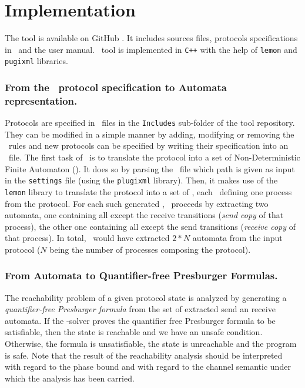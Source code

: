 \section{Implementation}
\label{sec:optim}

The tool is available on GitHub \cite{github.MPass}.
It includes sources files, protocols specifications in \Xml\ and the user manual.
%
\MPass\ tool is implemented in \texttt{C++} with the help of \texttt{lemon} and \texttt{pugixml} libraries.
%

\subsubsection*{From the \Xml\ protocol specification to Automata representation.}
\label{subsec:copies}
Protocols are specified in \Xml\ files in the \texttt{Includes} sub-folder of the tool repository.
%
They can be modified in a simple manner by adding, modifying or removing the \Xml\ rules and
new protocols can be specified by writing their specification into an \Xml\ file.
%
The first task of \MPass\ is to translate the protocol into a set of Non-Deterministic Finite Automaton (\Nfa).
%
It does so by parsing the \Xml\ file which path is given as input in the \texttt{settings} file (using the \texttt{plugixml} library).
%
Then, it makes use of the \texttt{lemon} library to translate the protocol into a set of \Nfa,
each \Nfa\ defining one process from the protocol.
%
For each such generated \Nfa, \MPass\ proceeds by extracting two automata,
one containing all except the receive transitions (\textit{send copy} of that process),
the other one containing all except the send transitions (\textit{receive copy} of that process).
%
In total, \MPass\ would have extracted $2*N$ automata from the input protocol
($N$ being the number of processes composing the protocol).

\subsubsection*{From Automata to Quantifier-free Presburger Formulas.}
The reachability problem of a given protocol state is analyzed by generating a \emph{quantifier-free Presburger formula}
from the set of extracted send an receive automata.
%
%
%
%
If the \Smt-solver proves the quantifier free Presburger formula to be satisfiable,
then the state is reachable and we have an unsafe condition.
Otherwise, the formula is unsatisfiable, the state is unreachable and the program is safe.
%
Note that the result of the reachability analysis should be interpreted with regard to the phase bound and with regard to the channel semantic
under which the analysis has been carried.

